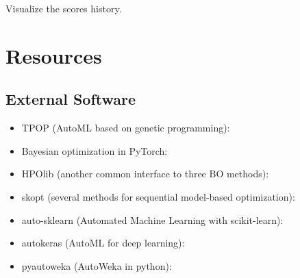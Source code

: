 \documentclass[letterpaper,10pt,english]{sphinxmanual}
\begin{document}
\begin{fulllineitems}
\begin{fulllineitems}
\begin{quote}
\begin{description}
\end{description}\end{quote}

\end{fulllineitems}


\begin{fulllineitems}
\label{\detokenize{apidoc:pysequd.sequd.SeqUD.plot_scores}}
Visualize the scores history.

\end{fulllineitems}


\end{fulllineitems}



\section{Resources}
\label{\detokenize{resources:resources}}\label{\detokenize{resources::doc}}

\subsection{External Software}
\label{\detokenize{resources:external-software}}\begin{itemize}
\item {} 
TPOP (AutoML based on genetic programming): 

\item {} 
Bayesian optimization in PyTorch: 

\item {} 
HPOlib (another common interface to three BO methods): 

\item {} 
skopt (several methods for sequential model-based optimization): 

\item {} 
auto-sklearn (Automated Machine Learning with scikit-learn): 

\item {} 
autokeras (AutoML for deep learning): 

\item {} 
pyautoweka (AutoWeka in python): 

\end{itemize}
\end{document}
